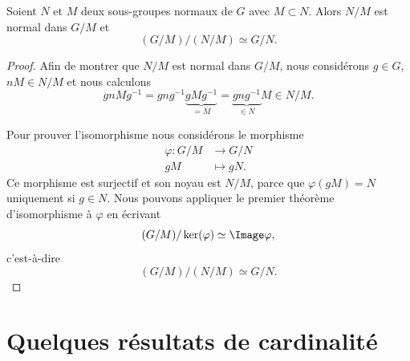 \begin{theorem}  \label{ThoezgBep}
	Soient \( N\) et \( M\) deux sous-groupes normaux de \( G\) avec \( M\subset N\). Alors \( N/M\) est normal dans \( G/M\) et
	\begin{equation}
		(G/M)/(N/M)\simeq G/N.
	\end{equation}
\end{theorem}

\begin{proof}
	Afin de montrer que \( N/M\) est normal dans \( G/M\), nous considérons \( g\in G\), \( nM\in N/M\) et nous calculons
	\begin{equation}
		gnMg^{-1}=gng^{-1}\underbrace{gMg^{-1}}_{=M}=\underbrace{gng^{-1}}_{\in N}M\in N/M.
	\end{equation}

	Pour prouver l'isomorphisme nous considérons le morphisme
	\begin{equation}
		\begin{aligned}
			\varphi\colon G/M & \to G/N     \\
			gM                & \mapsto gN.
		\end{aligned}
	\end{equation}
	Ce morphisme est surjectif et son noyau est \( N/M\), parce que \( \varphi(gM)=N\) uniquement si \( g\in N\). Nous pouvons appliquer le premier théorème d'isomorphisme à \( \varphi\) en écrivant
	\begin{equation}
		(G/M)/\ker(\varphi)\simeq\Image \varphi,
	\end{equation}
	c'est-à-dire
	\begin{equation}
		(G/M)/(N/M)\simeq G/N.
	\end{equation}
\end{proof}



\section{Quelques résultats de cardinalité}

